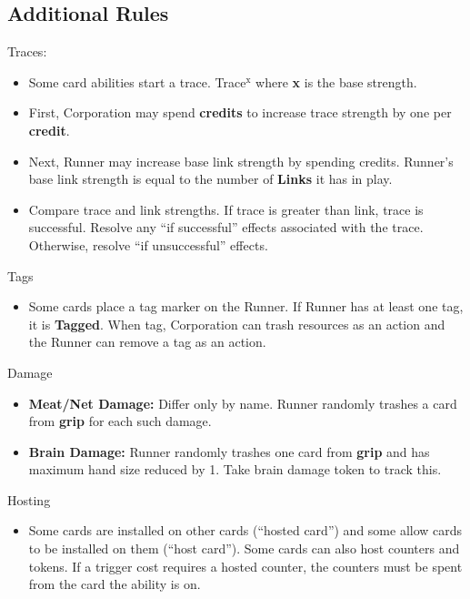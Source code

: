 \documentclass[12pt]{article}
\newenvironment{itemizeCustom}
{\begin{itemize}
  \setlength{\itemsep}{1pt}
  \setlength{\parskip}{0pt}
  \setlength{\parsep}{0pt}}
{\end{itemize}}
\begin{document}
\begin{multicols*}{2}
\section*{Additional Rules}
Traces:
\begin{itemizeCustom}
	\item Some card abilities start a trace. Trace$^{\textrm{x}}$ where \textbf{x} is the base strength.
	\item First, Corporation may spend \textbf{credits} to increase trace strength by one per \textbf{credit}.
	\item Next, Runner may increase base link strength by spending credits. Runner's base link strength is equal to the number of \textbf{Links} it has in play.
	\item Compare trace and link strengths. If trace is greater than link, trace is successful. Resolve any ``if successful'' effects associated with the trace. Otherwise, resolve ``if unsuccessful'' effects.
\end{itemizeCustom}

Tags
\begin{itemizeCustom}
	\item Some cards place a tag marker on the Runner. If Runner has at least one tag, it is \textbf{Tagged}. When tag, Corporation can trash resources as an action and the Runner can remove a tag as an action.
\end{itemizeCustom}

Damage
\begin{itemizeCustom}
	\item \textbf{Meat/Net Damage:} Differ only by name. Runner randomly trashes a card from \textbf{grip} for each such damage.
	\item \textbf{Brain Damage:} Runner randomly trashes one card from \textbf{grip} and has maximum hand size reduced by 1. Take brain damage token to track this.
\end{itemizeCustom}

Hosting
\begin{itemizeCustom}
	\item Some cards are installed on other cards (``hosted card'') and some allow cards to be installed on them (``host card''). Some cards can also host counters and tokens. If a trigger cost requires a hosted counter, the counters must be spent from the card the ability is on.
\end{itemizeCustom}
\end{multicols*}
\end{document}
